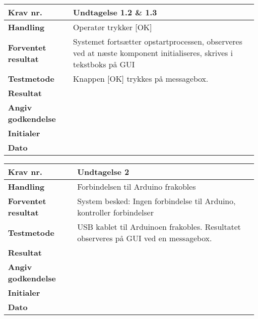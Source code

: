 	\begin{center}
		\begin{longtable}{ | m{4cm}| m{8.5cm}|} 
			\hline
			\textbf{Krav nr.} & Undtagelse 1.2 \& 1.3   \\ 
			\hline
			\textbf{Handling} & Operatør trykker [OK]  \\
			\hline
			\textbf{Forventet resultat} & Systemet fortsætter opstartprocessen, observeres ved at næste komponent initialiseres, skrives i tekstboks på GUI \\
			\hline
			\textbf{Testmetode}  & Knappen [OK] trykkes på messagebox.   \\
			\hline
			\textbf{Resultat}  &    \\
			\hline
			\textbf{Angiv godkendelse} &     \\
			\hline
			\textbf{Initialer} &     \\
			\hline
			\textbf{Dato} &    \\
			\hline
		\end{longtable}
	\end{center}	

	\begin{center}
		\begin{longtable}{ | m{4cm}| m{8.5cm}|} 
			\hline
			\textbf{Krav nr.} & Undtagelse 2   \\ 
			\hline
			\textbf{Handling} & Forbindelsen til Arduino frakobles  \\
			\hline
			\textbf{Forventet resultat} & System besked:  Ingen forbindelse til Arduino, kontroller forbindelser \\
			\hline
			\textbf{Testmetode}  & USB kablet til Arduinoen frakobles. Resultatet observeres på GUI ved en messagebox.   \\
			\hline
			\textbf{Resultat}  &    \\
			\hline
			\textbf{Angiv godkendelse} &     \\
			\hline
			\textbf{Initialer} &     \\
			\hline
			\textbf{Dato} &    \\
			\hline
		\end{longtable}
	\end{center}
	
\newpage	
	
